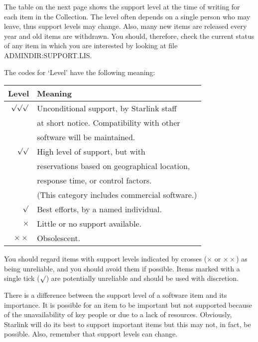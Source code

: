 The table on the next page shows the support level at the time of writing for
each item in the Collection.
The level often depends on a single person who may leave, thus support levels
may change.
Also, many new items are released every year and old items are withdrawn.
You should, therefore, check the current status of any item in which you are
interested by looking at file ADMINDIR:SUPPORT.LIS.

The codes for `Level' have the following meaning:
\begin{center}
\begin{tabular}{||r|l||}
\hline
Level & Meaning \\
\hline
\hline
$\surd\surd\surd$ & Unconditional support, by Starlink staff \\
                  & at short notice.  Compatibility with other \\
                  & software will be maintained. \\
\hline
$\surd\surd$      & High level of support, but with \\
                  & reservations based on geographical location, \\
                  & response time, or control factors. \\
                  & (This category includes commercial software.) \\
\hline
$\surd$           & Best efforts, by a named individual. \\
\hline
$\times$          & Little or no support available. \\
\hline
$\times\times$    & Obsolescent.\\
\hline
\end{tabular}
\end{center}
You should regard items with support levels indicated by crosses ($\times$ or
$\times\times$) as being unreliable, and you should avoid them if possible.
Items marked with a single tick ($\surd$) are potentially unreliable and
should be used with discretion.

There is a difference between the support level of a software item and its
importance.
It is possible for an item to be important but not supported because of
the unavailability of key people or due to a lack of resources.
Obviously, Starlink will do its best to support important items but this may
not, in fact, be possible.
Also, remember that support levels can change.

